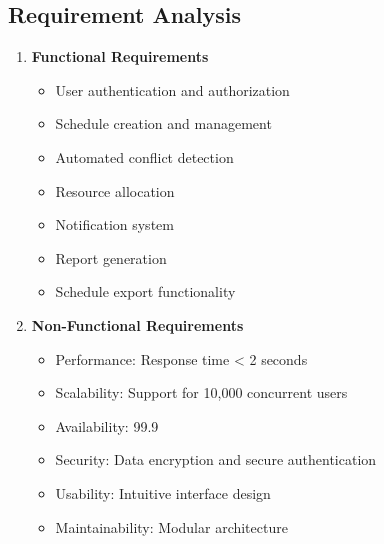\documentclass[12pt,a4paper]{report}
\begin{document}
\subsection{Requirement Analysis}
\begin{enumerate}
    \item \textbf{Functional Requirements}
    \begin{itemize}
        \item User authentication and authorization
        \item Schedule creation and management
        \item Automated conflict detection
        \item Resource allocation
        \item Notification system
        \item Report generation
        \item Schedule export functionality
    \end{itemize}
    
    \item \textbf{Non-Functional Requirements}
    \begin{itemize}
        \item Performance: Response time < 2 seconds
        \item Scalability: Support for 10,000 concurrent users
        \item Availability: 99.9%
        \item Security: Data encryption and secure authentication
        \item Usability: Intuitive interface design
        \item Maintainability: Modular architecture
    \end{itemize}
\end{enumerate}
\end{document}
